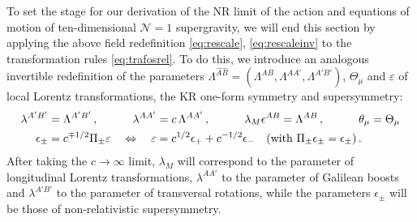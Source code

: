 \documentclass[a4paper,10pt,openany]{article}
\begin{document}
	To set the stage for our derivation of the NR limit of the action and equations of motion of ten-dimensional $\mathcal{N}=1$ supergravity, we will end this section by applying the above field redefinition \eqref{eq:rescale}, \eqref{eq:rescaleinv} to the transformation rules \eqref{eq:trafosrel}. To do this, we introduce an analogous invertible redefinition of the parameters $\Lambda^{\hat{A}\hat{B}} = \left(\Lambda^{AB}, \Lambda^{A A'}, \Lambda^{A' B'}\right)$, $\Theta_\mu$ and $\varepsilon$ of local Lorentz transformations, the KR one-form symmetry and supersymmetry:
	\begin{align}\label{eq:parresc}
		\lambda^{A'B'} &= \Lambda^{A'B'}\,, \qquad \quad  \lambda^{AA'} = c\,\Lambda^{AA'}\,,\qquad \quad \lambda_M\epsilon^{AB} = \Lambda^{AB}\,, \qquad \quad \theta_\mu = \Theta_\mu \notag\\
		\epsilon_\pm &= c^{\mp 1/2}\Pi_{\pm}\varepsilon \quad \Leftrightarrow \quad \varepsilon = c^{1/2} \epsilon_+ + c^{-1/2} \epsilon_- \quad (\text{with } \Pi_\pm \epsilon_\pm = \epsilon_\pm) \,.
	\end{align}
	After taking the $c\rightarrow \infty$ limit, $\lambda_M$ will correspond to the parameter of longitudinal Lorentz transformations, $\lambda^{AA'}$ to the parameter of Galilean boosts and $\lambda^{A'B'}$ to the parameter of transversal rotations, while the parameters $\epsilon_\pm$ will be those of non-relativistic supersymmetry.
	
\end{document}
